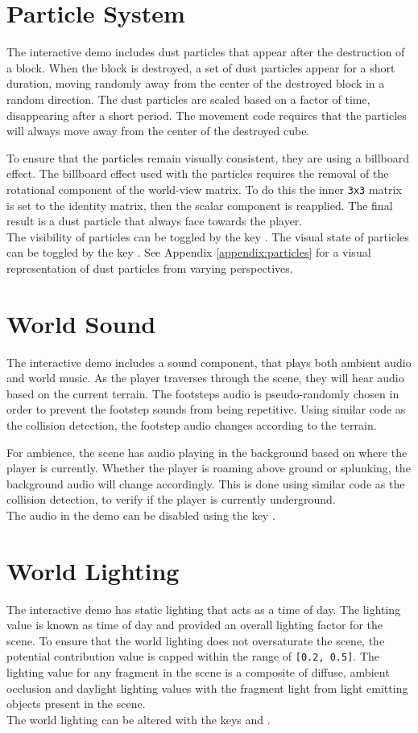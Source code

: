 \documentclass{book}
\begin{document}
\section{Particle System}
The interactive demo includes dust particles that appear after the destruction of a block.  When the block is destroyed, a set of dust particles appear for a short duration, moving randomly away from the center of the destroyed block in a random direction.  The dust particles are scaled based on a factor of time, disappearing after a short period.  The movement code requires that the particles will always move away from the center of the destroyed cube.

To ensure that the particles remain visually consistent, they are using a billboard effect.  The billboard effect used with the particles requires the removal of the rotational component of the world-view matrix.  To do this the inner \texttt{3x3} matrix is set to the identity matrix, then the scalar component is reapplied.  The final result is a dust particle that always face towards the player.
\\
The visibility of particles can be toggled by the key .  The visual state of particles can be toggled by the key .  See Appendix \ref{appendix:particles} for a visual representation of dust particles from varying perspectives.

\section{World Sound}
The interactive demo includes a sound component, that plays both ambient audio and world music.  As the player traverses through the scene, they will hear audio based on the current terrain.  The footsteps audio is pseudo-randomly chosen in order to prevent the footstep sounds from being repetitive.  Using similar code as the collision detection, the footstep audio changes according to the terrain.

For ambience, the scene has audio playing in the background based on where the player is currently.  Whether the player is roaming above ground or splunking, the background audio will change accordingly.  This is done using similar code as the collision detection, to verify if the player is currently underground.
\\
The audio in the demo can be disabled using the key .
    
\section{World Lighting}
The interactive demo has static lighting that acts as a time of day.  The lighting value is known as time of day and provided an overall lighting factor for the scene.  To ensure that the world lighting does not oversaturate the scene, the potential contribution value is capped within the range of \texttt{[0.2, 0.5]}.  The lighting value for any fragment in the scene is a composite of diffuse, ambient occlusion and daylight lighting values with the fragment light from light emitting objects present in the scene.
\\
The world lighting can be altered with the keys  and .
    
\end{document}
